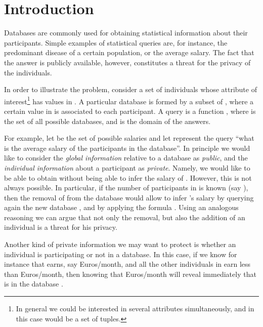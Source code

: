 \documentclass{llncs}
\begin{document}
\section{Introduction}\label{section:introduction}
Databases are commonly used for obtaining statistical information about their participants. Simple examples of statistical queries are, for instance, the predominant disease of a certain population,  or the average salary. 
The fact that the answer is publicly available, however, constitutes a threat  for the privacy of the individuals. 

In order to illustrate the problem, consider a set of individuals   whose attribute of interest\footnote{In general we could be interested in several attributes simultaneously, and in this case  would be a set of tuples.} has values in . 
A particular database is formed by a subset of , where a certain value in  is associated to each participant. 
A query  is a function , where   is the set of all possible databases, and 
 is the domain of the answers. 

For example, let    be the set of possible salaries and let  represent the query ``what is  the average salary of the participants in the database''. 
In principle we would like to consider the \emph{global information} relative to a database  as \emph{public}, and the \emph{individual information} about a participant  as \emph{private}.  Namely, we would like to be able to obtain  without being able to infer the salary of .  However, this is not always possible. In particular, if the number of participants in  is known (say  ), then the removal of   from the database would allow to infer 's salary by querying again the  new database , and by applying the formula . Using an analogous reasoning we can argue that not only the removal, but also the addition of an individual is a threat for his privacy. 

Another kind of private information we may want to protect is whether an individual  is participating or not in a database. In this case, if we know for instance that  earns, say   Euros/month, and all the other individuals in  earn less than  Euros/month, then knowing that  Euros/month will reveal immediately that  is in the database . 
\end{document}
